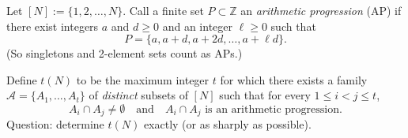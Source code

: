 Let $[N]:=\{1,2,\dots,N\}$.  Call a finite set $P\subset\mathbb{Z}$ an \emph{arithmetic progression} (AP) if there exist integers $a$ and $d\ge 0$ and an integer $\ell\ge 0$ such that
\[
P=\{a,a+d,a+2d,\dots,a+\ell d\}.
\]
(So singletons and 2-element sets count as APs.)

Define $t(N)$ to be the maximum integer $t$ for which there exists a family $\mathcal{A}=\{A_1,\dots,A_t\}$ of \emph{distinct} subsets of $[N]$ such that for every $1\le i<j\le t$,
\[
A_i\cap A_j \neq \emptyset
\quad\text{and}\quad
A_i\cap A_j \text{ is an arithmetic progression.}
\]
Question: determine $t(N)$ exactly (or as sharply as possible).
